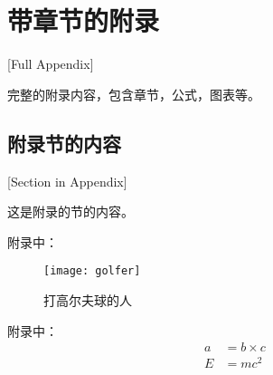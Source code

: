 
\chapter{带章节的附录}[Full Appendix]

完整的附录内容，包含章节，公式，图表等。

\section{附录节的内容}[Section in Appendix]

这是附录的节的内容。

附录中：
\begin{figure}[htbp]
	\centering
	\texttt{[image: golfer]}
	\caption{\xiaosi[0]打高尔夫球的人}
	\label{fig:appA}
\end{figure}

附录中：
\begin{align}
	a & = b \times c \\
	E & = m c^2
	\label{eq:appA}
\end{align}
